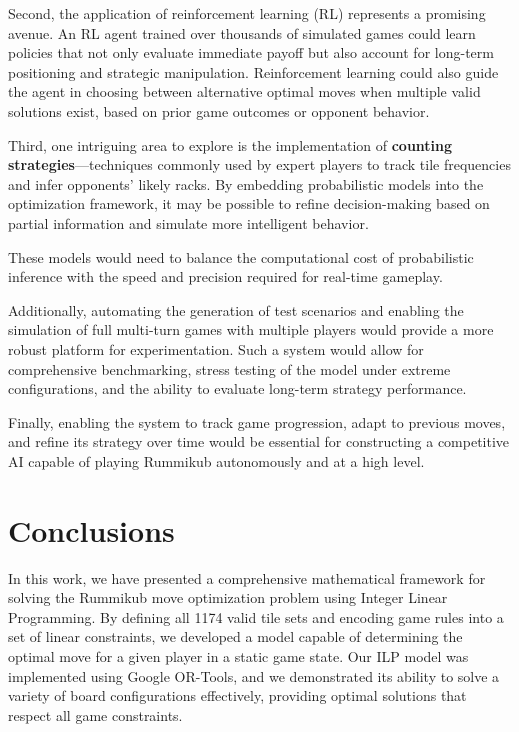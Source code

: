 \documentclass[11pt,letterpaper]{article}
\begin{document}
Second, the application of reinforcement learning (RL) represents a promising avenue. An RL agent trained over thousands of simulated games could learn policies that not only evaluate immediate payoff but also account for long-term positioning and strategic manipulation. Reinforcement learning could also guide the agent in choosing between alternative optimal moves when multiple valid solutions exist, based on prior game outcomes or opponent behavior.

Third, one intriguing area to explore is the implementation of \textbf{counting strategies}—techniques commonly used by expert players to track tile frequencies and infer opponents’ likely racks. By embedding probabilistic models into the optimization framework, it may be possible to refine decision-making based on partial information and simulate more intelligent behavior. 

These models would need to balance the computational cost of probabilistic inference with the speed and precision required for real-time gameplay.

Additionally, automating the generation of test scenarios and enabling the simulation of full multi-turn games with multiple players would provide a more robust platform for experimentation. Such a system would allow for comprehensive benchmarking, stress testing of the model under extreme configurations, and the ability to evaluate long-term strategy performance.

Finally, enabling the system to track game progression, adapt to previous moves, and refine its strategy over time would be essential for constructing a competitive AI capable of playing Rummikub autonomously and at a high level.


\section*{Conclusions}
In this work, we have presented a comprehensive mathematical framework for solving the Rummikub move optimization problem using Integer Linear Programming. By defining all 1174 valid tile sets and encoding game rules into a set of linear constraints, we developed a model capable of determining the optimal move for a given player in a static game state. Our ILP model was implemented using Google OR-Tools, and we demonstrated its ability to solve a variety of board configurations effectively, providing optimal solutions that respect all game constraints.
\end{document}
